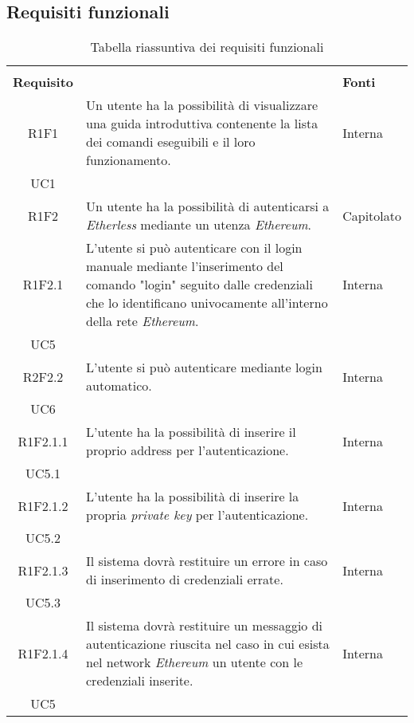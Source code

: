 \subsection{Requisiti funzionali}

\renewcommand{\arraystretch}{2.2}

\begin{longtable}{|c|p{8cm}|C{2cm}|}
	
	\caption{Tabella riassuntiva dei requisiti funzionali}\\
	
	
	\textbf{Requisito} &  & \textbf{Fonti}\\
	
	\endfirsthead
	
	R1F1 & Un utente ha la possibilità di visualizzare una guida introduttiva contenente la lista dei comandi eseguibili e il loro funzionamento. &  \centering Interna \\ UC1 \tabularnewline
	
	R1F2 & Un utente ha la possibilità di autenticarsi a \textit{Etherless} mediante un utenza \textit{Ethereum\glos}. & Capitolato \\
	
	R1F2.1 & L'utente si può autenticare con il login manuale mediante l'inserimento del comando "login" seguito dalle credenziali che lo identificano univocamente all'interno della rete \textit{Ethereum\glos}.  & \centering Interna \\ UC5 \tabularnewline
	
	R2F2.2 & L'utente si può autenticare mediante login automatico. & \centering Interna \\ UC6 \tabularnewline
	
	R1F2.1.1 &  L'utente ha la possibilità di inserire il proprio address per l'autenticazione. & \centering Interna \\ UC5.1 \tabularnewline
	
	R1F2.1.2 &  L'utente ha la possibilità di inserire la propria \textit{private key\glo} per l'autenticazione. & \centering Interna \\ UC5.2 \tabularnewline
	
	R1F2.1.3 &  Il sistema dovrà restituire un errore in caso di inserimento di credenziali errate. & \centering Interna \\ UC5.3 \tabularnewline
	
	R1F2.1.4 &  Il sistema dovrà restituire un messaggio di autenticazione riuscita nel caso in cui esista nel network \textit{Ethereum\glo} un utente con le credenziali inserite. & \centering Interna \\ UC5 \tabularnewline
	

\end{longtable}
